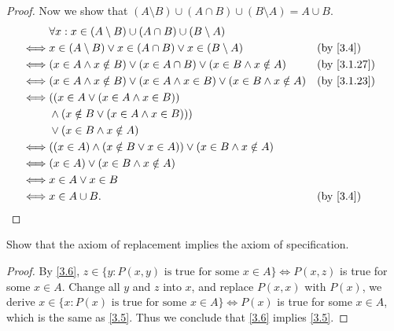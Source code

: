 \begin{proof}
  Now we show that \((A \setminus B) \cup (A \cap B) \cup (B \setminus A) = A \cup B\).
  \begin{align*}
         & \forall x : x \in (A \setminus B) \cup (A \cap B) \cup (B \setminus A)                                                 \\
    \iff & x \in (A \setminus B) \lor x \in (A \cap B) \lor x \in (B \setminus A)                  &  & \text{(by \cref{3.4})}    \\
    \iff & (x \in A \land x \notin B) \lor (x \in A \cap B) \lor (x \in B \land x \notin A)        &  & \text{(by \cref{3.1.27})} \\
    \iff & (x \in A \land x \notin B) \lor (x \in A \land x \in B) \lor (x \in B \land x \notin A) &  & \text{(by \cref{3.1.23})} \\
    \iff & ((x \in A \lor (x \in A \land x \in B))                                                                                \\
         & \land (x \notin B \lor (x \in A \land x \in B)))                                                                       \\
         & \lor (x \in B \land x \notin A)                                                                                        \\
    \iff & ((x \in A) \land (x \notin B \lor x \in A)) \lor (x \in B \land x \notin A)                                            \\
    \iff & (x \in A) \lor (x \in B \land x \notin A)                                                                              \\
    \iff & x \in A \lor x \in B                                                                                                   \\
    \iff & x \in A \cup B.                                                                         &  & \text{(by \cref{3.4})}
  \end{align*}
\end{proof}

\begin{ex}\label{ex:3.1.11}
  Show that the axiom of replacement implies the axiom of specification.
\end{ex}

\begin{proof}
  By \cref{3.6}, \(z \in \{y : P(x, y) \text{ is true for some } x \in A\} \iff P(x, z)\) is true for some \(x \in A\).
  Change all \(y\) and \(z\) into \(x\), and replace \(P(x, x)\) with \(P(x)\), we derive \(x \in \{x : P(x) \text{ is true for some } x \in A\} \iff P(x)\) is true for some \(x \in A\), which is the same as \cref{3.5}.
  Thus we conclude that \cref{3.6} implies \cref{3.5}.
\end{proof}